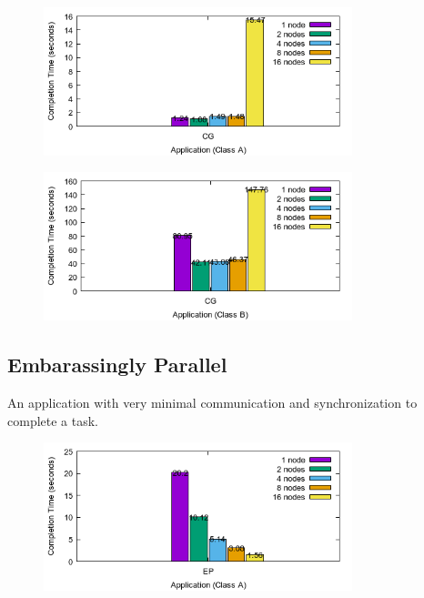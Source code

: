 \documentclass[a4paper]{article}
\begin{document}
\begin{figure}[H]
\centering
\includegraphics[width=0.8\textwidth]{figures/CGvA.png}
\caption{\label{fig:CGvA}}
\end{figure}

\begin{figure}[H]
\centering
\includegraphics[width=0.8\textwidth]{figures/CGvB.png}
\caption{\label{fig:CGvB}}
\end{figure}

\subsection{Embarassingly Parallel}

An application with very minimal communication and synchronization to complete a task.

\begin{figure}[H]
\centering
\includegraphics[width=0.8\textwidth]{figures/EPvA.png}
\caption{\label{fig:EPvA}}
\end{figure}
\end{document}
